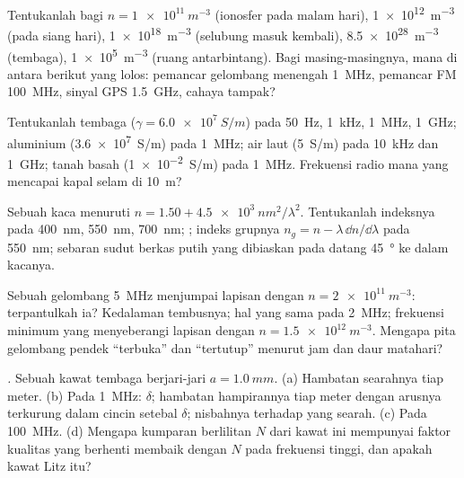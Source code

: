 \begin{exercise}[$\star$]\label{exo:b2:waves-in-media:1}
Tentukanlah  bagi $n = \qty{1e11}{m^{-3}}$ (ionosfer pada malam hari),
\qty{1e12}{m^{-3}} (pada siang hari), \qty{1e18}{m^{-3}} (selubung masuk kembali), \qty{8.5e28}{m^{-3}}
(tembaga), \qty{1e5}{m^{-3}} (ruang antarbintang). Bagi masing-masingnya, mana di antara
berikut yang lolos: pemancar gelombang menengah \qty{1}{MHz}, pemancar FM \qty{100}{MHz}, sinyal
GPS \qty{1.5}{GHz}, cahaya tampak?
\end{exercise}

\begin{exercise}[$\star$]\label{exo:b2:waves-in-media:2}
Tentukanlah  tembaga ($\gamma = \qty{6.0e7}{S/m}$) pada \qty{50}{Hz}, \qty{1}{kHz},
\qty{1}{MHz}, \qty{1}{GHz}; aluminium (\qty{3.6e7}{S/m}) pada \qty{1}{MHz}; air
laut (\qty{5}{S/m}) pada \qty{10}{kHz} dan \qty{1}{GHz}; tanah basah (\qty{1e-2}{S/m})
pada \qty{1}{MHz}. Frekuensi radio mana yang mencapai kapal selam di \qty{10}{m}?
\end{exercise}

\begin{exercise}[$\star$]\label{exo:b2:waves-in-media:3}
Sebuah kaca menuruti $n = 1.50 + \qty{4.5e3}{nm^2}/\lambda^2$. Tentukanlah indeksnya pada \qty{400}{nm},
\qty{550}{nm}, \qty{700}{nm}; ; indeks grupnya $n_g = n -
\lambda\,\dd n/\dd\lambda$ pada \qty{550}{nm}; sebaran sudut berkas putih yang
dibiaskan pada datang \qty{45}{\degree} ke dalam kacanya.
\end{exercise}

\begin{exercise}[$\star$]\label{exo:b2:waves-in-media:4}
Sebuah gelombang \qty{5}{MHz} menjumpai lapisan dengan $n = \qty{2e11}{m^{-3}}$: terpantulkah
ia? Kedalaman tembusnya; hal yang sama pada \qty{2}{MHz}; frekuensi minimum
yang menyeberangi lapisan dengan $n = \qty{1.5e12}{m^{-3}}$. Mengapa pita gelombang pendek
``terbuka'' dan ``tertutup'' menurut jam dan daur matahari?
\end{exercise}

\begin{exercise}[$\star\star$]\label{exo:b2:waves-in-media:5}
\emph{.} Sebuah kawat tembaga berjari-jari $a = \qty{1.0}{mm}$. (a) Hambatan
searahnya tiap meter. (b) Pada \qty{1}{MHz}: $\delta$; hambatan hampirannya
tiap meter dengan arusnya terkurung dalam cincin setebal $\delta$;
nisbahnya terhadap yang searah. (c) Pada \qty{100}{MHz}. (d) Mengapa kumparan berlilitan $N$ dari
kawat ini mempunyai faktor kualitas yang berhenti membaik dengan $N$ pada frekuensi
tinggi, dan apakah kawat Litz itu?
\end{exercise}

